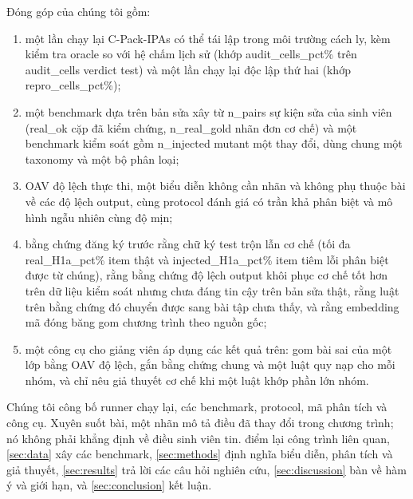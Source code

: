 Đóng góp của chúng tôi gồm:
\begin{enumerate}
\item một lần chạy lại C-Pack-IPAs có thể tái lập trong môi trường cách ly, kèm kiểm tra oracle so với hệ chấm lịch sử (khớp {{audit_cells_pct}}\% trên {{audit_cells}} verdict test) và một lần chạy lại độc lập thứ hai (khớp {{repro_cells_pct}}\%);
\item một benchmark dựa trên bản sửa xây từ {{n_pairs}} sự kiện sửa của sinh viên ({{real_ok}} cặp đã kiểm chứng, {{n_real_gold}} nhãn đơn cơ chế) và một benchmark kiểm soát gồm {{n_injected}} mutant một thay đổi, dùng chung một taxonomy và một bộ phân loại;
\item OAV độ lệch thực thi, một biểu diễn không cần nhãn và không phụ thuộc bài về các độ lệch output, cùng protocol đánh giá có trần khả phân biệt và mô hình ngẫu nhiên cùng độ mịn;
\item bằng chứng đăng ký trước rằng chữ ký test trộn lẫn cơ chế (tối đa {{real_H1a_pct}}\% item thật và {{injected_H1a_pct}}\% item tiêm lỗi phân biệt được từ chúng), rằng bằng chứng độ lệch output khôi phục cơ chế tốt hơn trên dữ liệu kiểm soát nhưng chưa đáng tin cậy trên bản sửa thật, rằng luật trên bằng chứng đó chuyển được sang bài tập chưa thấy, và rằng embedding mã đóng băng gom chương trình theo nguồn gốc;
\item một công cụ cho giảng viên áp dụng các kết quả trên: gom bài sai của một lớp bằng OAV độ lệch, gắn bằng chứng chung và một luật quy nạp cho mỗi nhóm, và chỉ nêu giả thuyết cơ chế khi một luật khớp phần lớn nhóm.
\end{enumerate}
Chúng tôi công bố runner chạy lại, các benchmark, protocol, mã phân tích và công cụ. Xuyên suốt bài, một nhãn mô tả điều đã thay đổi trong chương trình; nó không phải khẳng định về điều sinh viên tin.  điểm lại công trình liên quan, \cref{sec:data} xây các benchmark, \cref{sec:methods} định nghĩa biểu diễn, phân tích và giả thuyết, \cref{sec:results} trả lời các câu hỏi nghiên cứu, \cref{sec:discussion} bàn về hàm ý và giới hạn, và \cref{sec:conclusion} kết luận.
